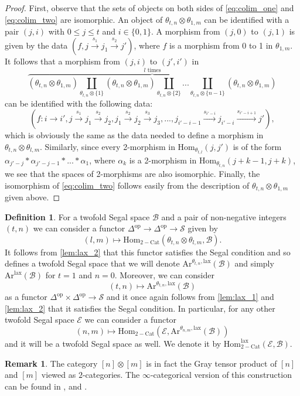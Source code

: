 \documentclass[a4paper, reqno]{amsart}
\theoremstyle{definition}
\newtheorem{defn}[theorem]{Definition}
\newtheorem{remark}[theorem]{Remark}
\newcommand\cB{\mathscr B}
\newcommand\cE{\mathscr E}
\newcommand\cS{\mathscr S}
\newcommand\mor{\mathrm{Hom}}
\newcommand\op{\mathrm{op}}
\newcommand\cat{\mathrm{Cat}}
\newcommand\arr{\mathrm{Ar}}
\newcommand\lax{\mathrm{lax}}
\begin{document}
\begin{proof}
First, observe that the sets of objects on both sides of \cref{eq:colim_one} and \cref{eq:colim_two} are isomorphic. An object of $\theta_{t,n}\otimes\theta_{1,m}$ can be identified with a pair $(j,i)$ with $0\leq j\leq t$ and $i\in\{0,1\}$. A morphism from $(j,0)$ to $(j,1)$ is given by the data $(f, j\xrightarrow{s_1}j_1\xrightarrow{s_2}j')$, where $f$ is a morphism from 0 to 1 in $\theta_{1,m}$. It follows that a morphism from $(j,i)$ to $(j',i')$ in 
\[ \overbrace{(\theta_{t,n}\otimes\theta_{1,m})\coprod_{\theta_{t,n}\otimes\{1\}}(\theta_{t,n}\otimes\theta_{1,m})\coprod_{\theta_{t,n}\otimes\{2\}}...\coprod_{\theta_{t,n}\otimes\{n-1\}}(\theta_{t,n}\otimes\theta_{1,m})}^\text{$l$ times}\]
can be identified with the following data:
\[(f:i\rightarrow i',j\xrightarrow{s_1}j_1\xrightarrow{s_2}j_2, j_1\xrightarrow{s_2}j_2\xrightarrow{s_3}j_3,..., j_{i'-i-1}\xrightarrow{s_{i'-i}}j_{i'-i}\xrightarrow{s_{i'-i+1}}j'),\]
which is obviously the same as the data needed to define a morphism in $\theta_{t,n}\otimes\theta_{l,m}$. Similarly, since every 2-morphism in $\mor_{\theta_{t,l}}(j,j')$ is of the form $\alpha_{j'-j}*\alpha_{j'-j-1}*...*\alpha_1$, where $\alpha_k$ is a 2-morphism in $\mor_{\theta_{t,n}}(j+k-1,j+k)$, we see that the spaces of 2-morphisms are also isomorphic. Finally, the isomorphism of \cref{eq:colim_two} follows easily from the description of $\theta_{t,n}\otimes\theta_{1,m}$ given above.
\end{proof}
\begin{defn}
For a twofold Segal space $\cB$ and a pair of non-negative integers $(t,n)$ we can consider a functor $\Delta^\op\rightarrow\Delta^\op\rightarrow\cS$ given by 
\[(l,m)\mapsto \mor_{2-\cat}(\theta_{t,n}\otimes\theta_{l,m},\cB).\]
It follows from \cref{lem:lax_2} that this functor satisfies the Segal condition and so defines a twofold Segal space that we will denote $\arr^{\theta_{t,n},\lax}(\cB)$ and simply $\arr^\lax(\cB)$ for $t=1$ and $n=0$. Moreover, we can consider
\[(t,n)\mapsto\arr^{\theta_{t,n},\lax}(\cB)\]
as a functor $\Delta^\op\times\Delta^\op\rightarrow\cS$ and it once again follows from \cref{lem:lax_1} and \cref{lem:lax_2} that it satisfies the Segal condition. In particular, for any other twofold Segal space $\cE$ we can consider a functor 
\[(n,m)\mapsto\mor_{2-\cat}(\cE,\arr^{\theta_{n,m},\lax}(\cB))\]
and it will be a twofold Segal space as well. We denote it by $\mor_{2-\cat}^\lax(\cE,\cB)$.
\end{defn}
\begin{remark}
The category $[n]\otimes[m]$ is in fact the Gray tensor product of $[n]$ and $[m]$ viewed as $2$-categories. The $\infty$-categorical version of this construction can be found in \cite{gaitsgory2017study}, \cite{haugseng2020fibrational} and \cite{gagna2020gray}.
\end{remark}
\end{document}
